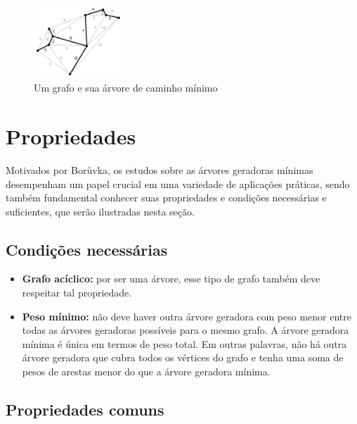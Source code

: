 \documentclass{article}
\begin{document}
\begin{figure}[h]
\centering
\includegraphics[width = 0.3\textwidth]{Minimum_spanning_tree.svg.png}
\caption{Um grafo e sua árvore de caminho mínimo}
\label{fig:enter-label}
\end{figure}

\section{Propriedades}

Motivados por Borůvka, os estudos sobre as árvores geradoras mínimas desempenham um papel crucial em uma variedade de aplicações práticas, sendo também fundamental conhecer suas propriedades e condições necessárias e suficientes, que serão ilustradas nesta seção.

\subsection{Condições necessárias}
\begin{itemize}
    \item \textbf{Grafo acíclico:} por ser uma árvore, esse tipo de grafo também deve respeitar tal propriedade.
    \item \textbf{Peso mínimo:} não deve haver outra árvore geradora com peso menor entre todas as árvores geradoras possíveis para o mesmo grafo. A árvore geradora mínima é única em termos de peso total. Em outras palavras, não há outra árvore geradora que cubra todos os vértices do grafo e tenha uma soma de pesos de arestas menor do que a árvore geradora mínima.
\end{itemize}

\subsection{Propriedades comuns}
\end{document}
